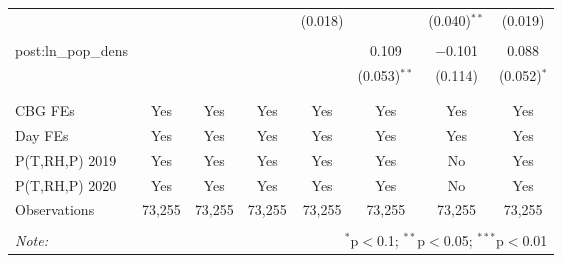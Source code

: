 \begin{table}[!htbp]
\begin{tabular}{@{\extracolsep{5pt}}lccccccc}
  &  &  &  & (0.018) &  & (0.040)$^{**}$ & (0.019) \\ 
  & & & & & & & \\ 
 post:ln\_pop\_dens &  &  &  &  & 0.109 & $-$0.101 & 0.088 \\ 
  &  &  &  &  & (0.053)$^{**}$ & (0.114) & (0.052)$^{*}$ \\ 
  & & & & & & & \\ 
\hline \\[-1.8ex] 
CBG FEs & Yes & Yes & Yes & Yes & Yes & Yes & Yes \\ 
Day FEs & Yes & Yes & Yes & Yes & Yes & Yes & Yes \\ 
P(T,RH,P) 2019 & Yes & Yes & Yes & Yes & Yes & No & Yes \\ 
P(T,RH,P) 2020 & Yes & Yes & Yes & Yes & Yes & No & Yes \\ 
Observations & 73,255 & 73,255 & 73,255 & 73,255 & 73,255 & 73,255 & 73,255 \\ 
\hline 
\hline \\[-1.8ex] 
\textit{Note:}  & \multicolumn{7}{r}{$^{*}$p$<$0.1; $^{**}$p$<$0.05; $^{***}$p$<$0.01} \\ 
\end{tabular} 
\end{table} 
